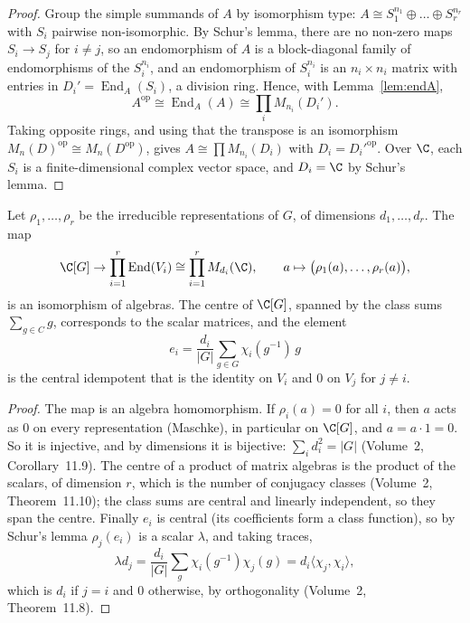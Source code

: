 \begin{proof}
Group the simple summands of $A$ by isomorphism type: $A\cong S_1^{n_1}\oplus\dots\oplus S_r^{n_r}$ with $S_i$ pairwise non-isomorphic. By Schur's lemma, there are no non-zero maps $S_i\to S_j$ for $i\ne j$, so an endomorphism of
$A$ is a block-diagonal family of endomorphisms of the $S_i^{n_i}$, and an endomorphism of $S_i^{n_i}$ is an $n_i\times n_i$ matrix with entries in $D_i'=\operatorname{End}_A(S_i)$, a division ring. Hence, with Lemma~\ref{lem:endA},
\[
A^{\mathrm{op}}\cong\operatorname{End}_A(A)\cong\prod_iM_{n_i}(D_i').
\]
Taking opposite rings, and using that the transpose is an isomorphism $M_n(D)^{\mathrm{op}}\cong M_n(D^{\mathrm{op}})$, gives $A\cong\prod M_{n_i}(D_i)$ with $D_i=D_i'^{\mathrm{op}}$. Over $\C$, each $S_i$ is a finite-dimensional
complex vector space, and $D_i=\C$ by Schur's lemma.
\end{proof}

\begin{corollary}\label{cor:wedderburnCG}
Let $\rho_1,\dots,\rho_r$ be the irreducible representations of $G$, of dimensions $d_1,\dots,d_r$. The map
\[
\C[G]\to\prod_{i=1}^r\operatorname{End}(V_i)\cong\prod_{i=1}^rM_{d_i}(\C),\qquad a\mapsto\bigl(\rho_1(a),\dots,\rho_r(a)\bigr),
\]
is an isomorphism of algebras. The centre of $\C[G]$, spanned by the class sums $\sum_{g\in C}g$, corresponds to the scalar matrices, and the element
\[
e_i=\frac{d_i}{|G|}\sum_{g\in G}\chi_i(g^{-1})\,g
\]
is the central idempotent that is the identity on $V_i$ and $0$ on $V_j$ for $j\ne i$.
\end{corollary}

\begin{proof}
The map is an algebra homomorphism. If $\rho_i(a)=0$ for all $i$, then $a$ acts as $0$ on every representation (Maschke), in particular on $\C[G]$, and $a=a\cdot1=0$. So it is injective, and by dimensions it is bijective:
$\sum_id_i^2=|G|$ (Volume~2, Corollary~11.9). The centre of a product of matrix algebras is the product of the scalars, of dimension $r$, which is the number of conjugacy classes (Volume~2, Theorem~11.10); the class sums are central
and linearly independent, so they span the centre. Finally $e_i$ is central (its coefficients form a class function), so by Schur's lemma $\rho_j(e_i)$ is a scalar $\lambda$, and taking traces,
\[
\lambda d_j=\frac{d_i}{|G|}\sum_g\chi_i(g^{-1})\chi_j(g)=d_i\langle\chi_j,\chi_i\rangle,
\]
which is $d_i$ if $j=i$ and $0$ otherwise, by orthogonality (Volume~2, Theorem~11.8).
\end{proof}

